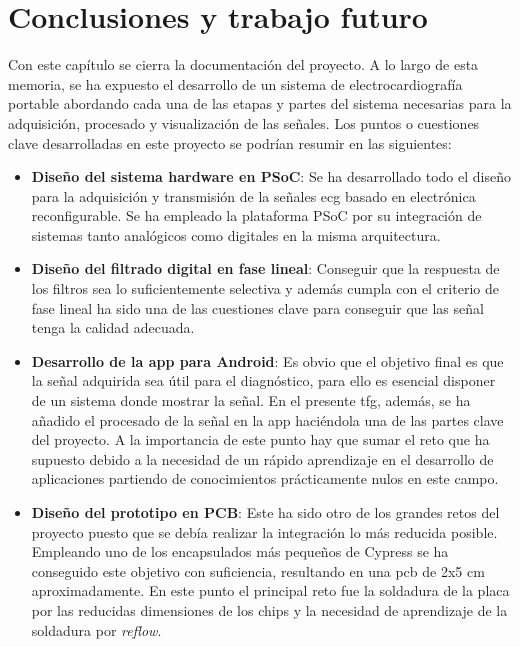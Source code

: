 \chapter{Conclusiones y trabajo futuro}\label{sec: Conclusiones}

\makeatletter
\def\clearpage{%
  \ifvmode
    \ifnum \@dbltopnum =\m@ne
      \ifdim \pagetotal <\topskip
        \hbox{}
      \fi
    \fi
  \fi
  \newpage
  \thispagestyle{empty}
  \write\m@ne{}
  \vbox{}
  \penalty -\@Mi
}
\makeatother

Con este capítulo se cierra la documentación del proyecto. A lo largo de esta memoria, se ha expuesto el desarrollo de un sistema de electrocardiografía portable abordando cada una de las etapas y partes del sistema necesarias para la adquisición, procesado y visualización de las señales. Los puntos o cuestiones clave desarrolladas en este proyecto se podrían resumir en las siguientes:

\begin{itemize}
	\item \textbf{Diseño del sistema hardware en PSoC}: Se ha desarrollado todo el diseño para la adquisición y transmisión de la señales \acrshort{ecg} basado en electrónica reconfigurable. Se ha empleado la plataforma PSoC por su integración de sistemas tanto analógicos como digitales en la misma arquitectura.
	
	\item \textbf{Diseño del filtrado digital en fase lineal}: Conseguir que la respuesta de los filtros sea lo suficientemente selectiva y además cumpla con el criterio de fase lineal ha sido una de las cuestiones clave para conseguir que las señal tenga la calidad adecuada.
	
	\item \textbf{Desarrollo de la app para Android}: Es obvio que el objetivo final es que la señal adquirida sea útil para el diagnóstico, para ello es esencial disponer de un sistema donde mostrar la señal. En el presente \acrshort{tfg}, además, se ha añadido el procesado de la señal en la app haciéndola una de las partes clave del proyecto. A la importancia de este punto hay que sumar el reto que ha supuesto debido a la necesidad de un rápido aprendizaje en el desarrollo de aplicaciones partiendo de conocimientos prácticamente nulos en este campo.

	
	\item \textbf{Diseño del prototipo en PCB}: Este ha sido otro de los grandes retos del proyecto puesto que se debía realizar la integración lo más reducida posible. Empleando uno de los encapsulados más pequeños de Cypress se ha conseguido este objetivo con suficiencia, resultando en una \acrshort{pcb} de 2x5 cm aproximadamente. En este punto el principal reto fue la soldadura de la placa por las reducidas dimensiones de los chips y la necesidad de aprendizaje de la soldadura por \textit{reflow}.
	
\end{itemize}

